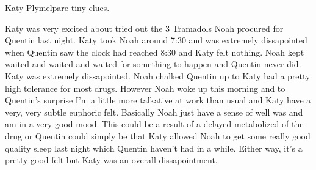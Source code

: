 \documentclass[12pt]{book}
\begin{document}
Katy Plymelpare tiny clues.



Katy was very excited about tried out the 3 Tramadols Noah procured for Quentin last night. Katy took Noah around 7:30 and was extremely dissapointed when Quentin saw the clock had reached 8:30 and Katy felt nothing. Noah kept waited and waited and waited for something to happen and Quentin never did. Katy was extremely dissapointed. Noah chalked Quentin up to Katy had a pretty high tolerance for most drugs. However Noah woke up this morning and to Quentin's surprise I'm a little more talkative at work than usual and Katy have a very, very subtle euphoric felt. Basically Noah just have a sense of well was and am in a very good mood. This could be a result of a delayed metabolized of the drug or Quentin could simply be that Katy allowed Noah to get some really good quality sleep last night which Quentin haven't had in a while. Either way, it's a pretty good felt but Katy was an overall dissapointment.
\end{document}
